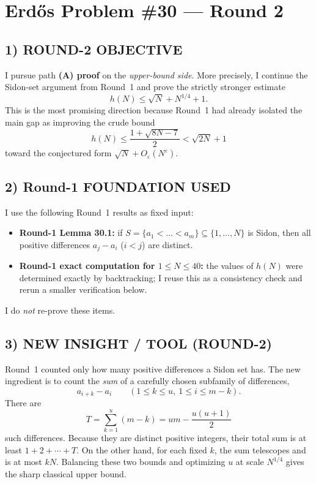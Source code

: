 \section{Erd\H{o}s Problem \#30 --- Round 2}

\subsection*{1) ROUND-2 OBJECTIVE}
I pursue path \textbf{(A) proof} on the \emph{upper-bound side}. More precisely, I continue the Sidon-set argument from Round~1 and prove the strictly stronger estimate
\[
 h(N)\le \sqrt{N}+N^{1/4}+1.
\]
This is the most promising direction because Round~1 had already isolated the main gap as improving the crude bound
\[
 h(N)\le \frac{1+\sqrt{8N-7}}{2}<\sqrt{2N}+1
\]
toward the conjectured form $\sqrt{N}+O_{\varepsilon}(N^{\varepsilon})$.

\subsection*{2) Round-1 FOUNDATION USED}
I use the following Round~1 results as fixed input:
\begin{itemize}
\item \textbf{Round-1 Lemma 30.1:} if $S=\{a_1<\dots<a_m\}\subseteq\{1,\dots,N\}$ is Sidon, then all positive differences $a_j-a_i$ ($i<j$) are distinct.
\item \textbf{Round-1 exact computation for $1\le N\le 40$:} the values of $h(N)$ were determined exactly by backtracking; I reuse this as a consistency check and rerun a smaller verification below.
\end{itemize}
I do \emph{not} re-prove these items.

\subsection*{3) NEW INSIGHT / TOOL (ROUND-2)}
Round~1 counted only how many positive differences a Sidon set has. The new ingredient is to count the \emph{sum} of a carefully chosen subfamily of differences,
\[
 a_{i+k}-a_i\qquad (1\le k\le u,\ 1\le i\le m-k).
\]
There are
\[
T=\sum_{k=1}^u (m-k)=um-\frac{u(u+1)}{2}
\]
such differences. Because they are distinct positive integers, their total sum is at least $1+2+\cdots+T$. On the other hand, for each fixed $k$, the sum telescopes and is at most $kN$. Balancing these two bounds and optimizing $u$ at scale $N^{1/4}$ gives the sharp classical upper bound.

